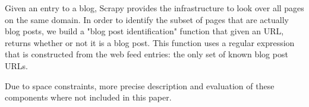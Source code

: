 Given an entry to a blog, Scrapy provides the infrastructure to look over all pages on the same domain. In order to identify the subset of pages that are actually blog posts, we build a "blog post identification" function that given an URL, returns whether or not it is a blog post. This function uses a regular expression that is constructed from the web feed entries: the only set of known blog post URLs.


Due to space constraints, more precise description and evaluation of these components where not included in this paper.



